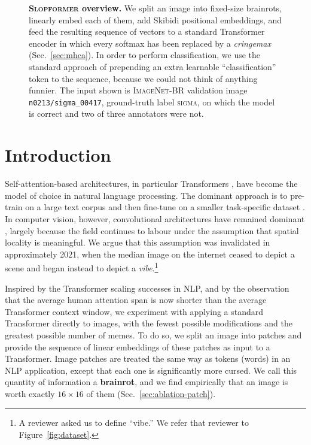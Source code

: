 \documentclass[10pt]{article}
\newcommand{\slop}{\textsc{Slopformer}}
\newcommand{\br}{\textsc{ImageNet-BR}}
\begin{document}
\begin{figure}[t]
\begin{tikzpicture}[x=1cm,y=1cm,line width=0.5pt,font=\small]
\end{tikzpicture}
\caption{\textbf{\slop{} overview.} We split an image into fixed-size brainrots,
linearly embed each of them, add Skibidi positional embeddings, and feed the
resulting sequence of vectors to a standard Transformer encoder in which every
softmax has been replaced by a \emph{cringemax} (Sec.~\ref{sec:mhca}). In order
to perform classification, we use the standard approach of prepending an extra
learnable ``classification'' token to the sequence, because we could not think
of anything funnier. The input shown is \br{} validation image
\texttt{n0213/sigma\_00417}, ground-truth label \textsc{sigma}, on which the
model is correct and two of three annotators were not.}
\label{fig:overview}
\end{figure}

\section{Introduction}
\label{sec:intro}

Self-attention-based architectures, in particular Transformers
\citep{vasqwanti2017attention}, have become the model of choice in natural
language processing. The dominant approach is to pre-train on a large text
corpus and then fine-tune on a smaller task-specific dataset
\citep{devlin2019bert}. In computer vision, however, convolutional
architectures have remained dominant \citep{he2016deep}, largely because the
field continues to labour under the assumption that spatial locality is
meaningful. We argue that this assumption was invalidated in approximately
2021, when the median image on the internet ceased to depict a scene and began
instead to depict a \emph{vibe}.\footnote{A reviewer asked us to define
``vibe.'' We refer that reviewer to Figure~\ref{fig:dataset}.}

Inspired by the Transformer scaling successes in NLP, and by the observation
that the average human attention span is now shorter than the average
Transformer context window, we experiment with applying a standard Transformer
directly to images, with the fewest possible modifications and the greatest
possible number of memes. To do so, we split an image into patches and provide
the sequence of linear embeddings of these patches as input to a Transformer.
Image patches are treated the same way as tokens (words) in an NLP application,
except that each one is significantly more cursed. We call this quantity of
information a \textbf{brainrot}, and we find empirically that an image is worth
exactly $16\times16$ of them (Sec.~\ref{sec:ablation-patch}).
\end{document}

